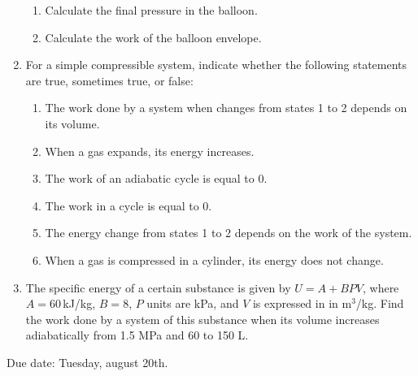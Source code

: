 \documentclass[11pt]{article} %
\begin{document}
\begin{enumerate}
\begin{enumerate}
\item Calculate the final pressure in the balloon.
\item Calculate the work of the balloon envelope.
\end{enumerate}
\item For a simple compressible system, indicate whether the following statements are true, sometimes true, or false:
\begin{enumerate}
\item The work done by a system when changes from states 1 to 2 depends on its volume.
\item When a gas expands, its energy increases.
\item The work of an adiabatic cycle is equal to 0.
\item The work in a cycle is equal to 0.
\item The energy change from states 1 to 2 depends on the work of the system.
\item When a gas is compressed in a cylinder, its energy does not change.
\end{enumerate}
\item The specific energy of a certain substance is given by $U = A + BPV$, where $A =
60$\,kJ/kg, $B = 8$, $P$ units are kPa, and $V$ is expressed in in m$^3$/kg. Find the work done by a system of this substance when its volume increases adiabatically from 1.5 MPa and 60 to 150 L.
\end{enumerate}
\vfill
Due date: Tuesday, august 20th.
\end{document}
